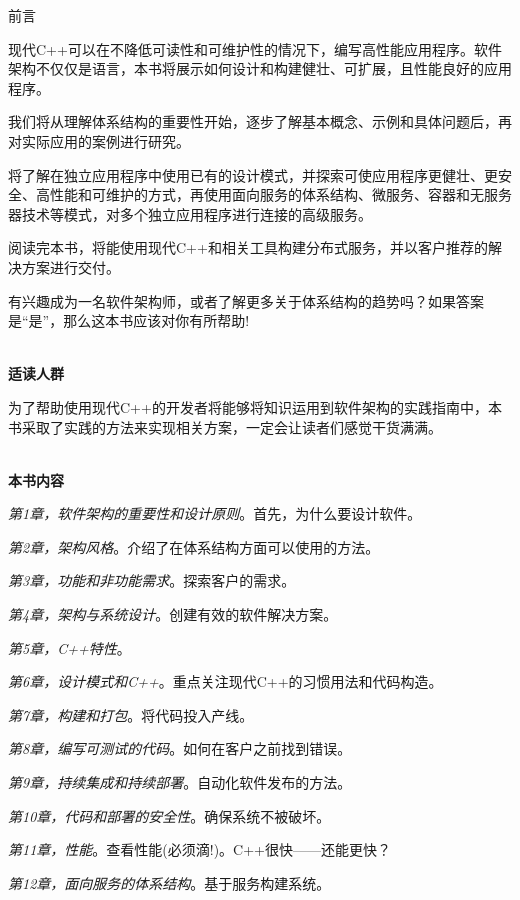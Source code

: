 \begin{flushright}
	 前言
\end{flushright}

现代C++可以在不降低可读性和可维护性的情况下，编写高性能应用程序。软件架构不仅仅是语言，本书将展示如何设计和构建健壮、可扩展，且性能良好的应用程序。

我们将从理解体系结构的重要性开始，逐步了解基本概念、示例和具体问题后，再对实际应用的案例进行研究。

将了解在独立应用程序中使用已有的设计模式，并探索可使应用程序更健壮、更安全、高性能和可维护的方式，再使用面向服务的体系结构、微服务、容器和无服务器技术等模式，对多个独立应用程序进行连接的高级服务。

阅读完本书，将能使用现代C++和相关工具构建分布式服务，并以客户推荐的解决方案进行交付。

有兴趣成为一名软件架构师，或者了解更多关于体系结构的趋势吗？如果答案是“是”，那么这本书应该对你有所帮助!


\hspace*{\fill} \\ %
\noindent\textbf{适读人群}

为了帮助使用现代C++的开发者将能够将知识运用到软件架构的实践指南中，本书采取了实践的方法来实现相关方案，一定会让读者们感觉干货满满。

\hspace*{\fill} \\ %
\textbf{本书内容}

\textit{第1章，软件架构的重要性和设计原则}。首先，为什么要设计软件。

\textit{第2章，架构风格}。介绍了在体系结构方面可以使用的方法。

\textit{第3章，功能和非功能需求}。探索客户的需求。

\textit{第4章，架构与系统设计}。创建有效的软件解决方案。

\textit{第5章，C++特性}。

\textit{第6章，设计模式和C++}。重点关注现代C++的习惯用法和代码构造。

\textit{第7章，构建和打包}。将代码投入产线。

\textit{第8章，编写可测试的代码}。如何在客户之前找到错误。

\textit{第9章，持续集成和持续部署}。自动化软件发布的方法。

\textit{第10章，代码和部署的安全性}。确保系统不被破坏。

\textit{第11章，性能}。查看性能(必须滴!)。C++很快——还能更快？

\textit{第12章，面向服务的体系结构}。基于服务构建系统。

